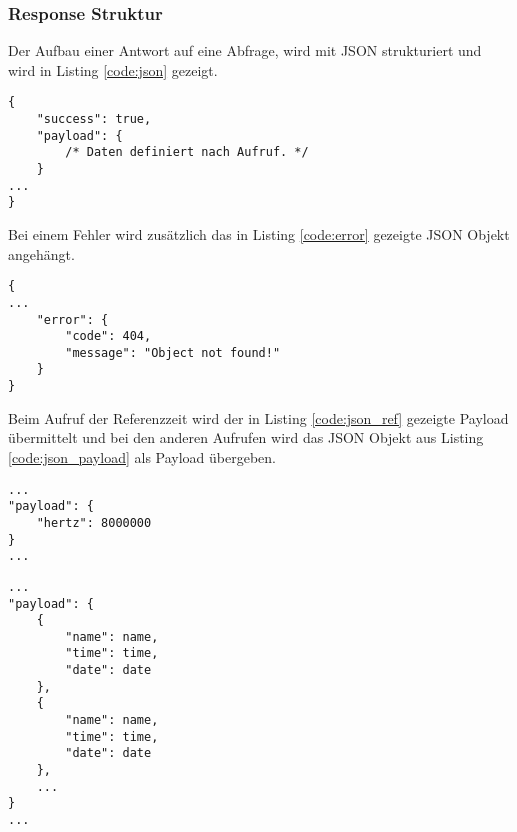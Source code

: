 \clearpage
\subsubsection{Response Struktur}
Der Aufbau einer Antwort auf eine Abfrage, wird mit JSON strukturiert und wird in Listing \ref{code:json} gezeigt.
\begin{lstlisting}[caption="generische Antwortstruktur mit JSON",label={code:json}]
{
    "success": true,
    "payload": {
        /* Daten definiert nach Aufruf. */
    }
...
}
\end{lstlisting}

\noindent Bei einem Fehler wird zusätzlich das in Listing \ref{code:error} gezeigte JSON Objekt angehängt.
\begin{lstlisting}[caption="JSON Objekt bei Fehler",label={code:error}]
{
...
    "error": {
        "code": 404,
        "message": "Object not found!"
    }
}
\end{lstlisting}

\noindent Beim Aufruf der Referenzzeit wird der in Listing \ref{code:json_ref} gezeigte Payload übermittelt und bei den anderen Aufrufen wird das JSON Objekt aus Listing \ref{code:json_payload} als Payload übergeben.
\begin{lstlisting}[caption="Payload für Referenzzeit",label={code:json_ref}]
...
"payload": {
    "hertz": 8000000
}
...
\end{lstlisting}
\begin{lstlisting}[caption="Payload für Datums und Namensabfrage",label={code:json_payload}]
...
"payload": {
    {
        "name": name,
        "time": time,
        "date": date
    },
    {
        "name": name,
        "time": time,
        "date": date
    },
    ...
}
...
\end{lstlisting}